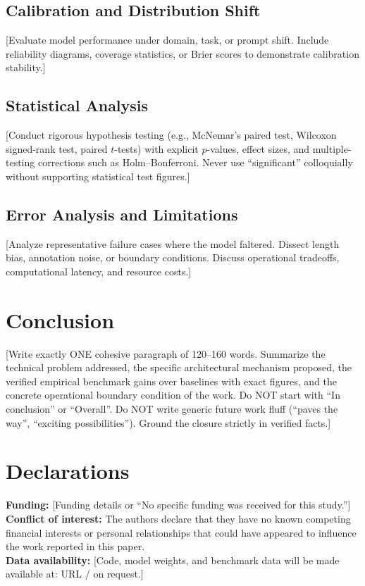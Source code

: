 \documentclass[a4paper,fleqn]{cas-sc}
\begin{document}
\subsection{Calibration and Distribution Shift}
[Evaluate model performance under domain, task, or prompt shift. Include reliability diagrams, coverage statistics, or Brier scores to demonstrate calibration stability.]

\subsection{Statistical Analysis}
[Conduct rigorous hypothesis testing (e.g., McNemar's paired test, Wilcoxon signed-rank test, paired $t$-tests) with explicit $p$-values, effect sizes, and multiple-testing corrections such as Holm--Bonferroni. Never use ``significant'' colloquially without supporting statistical test figures.]

\subsection{Error Analysis and Limitations}
[Analyze representative failure cases where the model faltered. Dissect length bias, annotation noise, or boundary conditions. Discuss operational tradeoffs, computational latency, and resource costs.]

\section{Conclusion}\label{sec:conclusion}
[Write exactly ONE cohesive paragraph of 120–160 words. Summarize the technical problem addressed, the specific architectural mechanism proposed, the verified empirical benchmark gains over baselines with exact figures, and the concrete operational boundary condition of the work. Do NOT start with ``In conclusion'' or ``Overall''. Do NOT write generic future work fluff (``paves the way'', ``exciting possibilities''). Ground the closure strictly in verified facts.]

\section*{Declarations}
\textbf{Funding:} [Funding details or ``No specific funding was received for this study.''] \\
\textbf{Conflict of interest:} The authors declare that they have no known competing financial interests or personal relationships that could have appeared to influence the work reported in this paper. \\
\textbf{Data availability:} [Code, model weights, and benchmark data will be made available at: URL / on request.]
\end{document}
